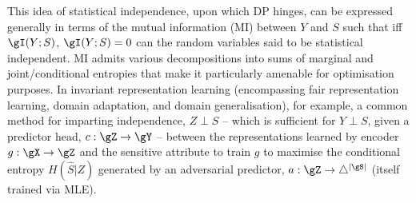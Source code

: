 %
%
This idea of statistical independence, upon which \ac{DP} hinges, can be expressed generally in terms of
the mutual information (MI) between \(Y\) and \(S\) such that
iff \( \gI(Y;S)\), \( \gI(Y;S) = 0  \) can the random variables said to be statistical independent.
%
MI admits various decompositions into sums of marginal and joint/conditional entropies that make it
particularly amenable for optimisation purposes. 
%
In invariant representation learning (encompassing fair representation learning, domain adaptation,
and domain generalisation), for example, a common method for imparting independence, \(Z \perp S \)
-- which is sufficient for \(Y \perp S\), given a predictor head, \(c: \gZ \to \gY \) -- between
the representations learned by encoder \(g: \gX \to \gZ \) and the sensitive attribute to train
\(g\) to maximise the conditional entropy \( H(\hat{S}|Z) \) generated by an adversarial predictor,
\(a: \gZ \to \bigtriangleup^{|\gS|}\) (itself trained via MLE).

